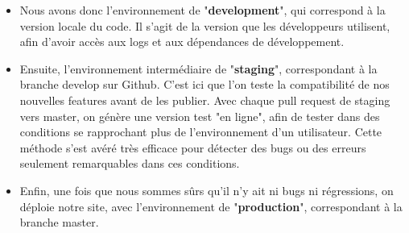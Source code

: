 \begin{itemize}
    \item Nous avons donc l'environnement de "\textbf{development}", qui correspond à la version locale du code. Il s'agit de la version que les développeurs utilisent, afin d'avoir accès aux logs et aux dépendances de développement. 
    \item Ensuite, l'environnement intermédiaire de "\textbf{staging}", correspondant à la branche develop sur Github. C'est ici que l'on teste la compatibilité de nos nouvelles features avant de les publier. Avec chaque pull request de staging vers master, on génère une version test "en ligne", afin de tester dans des conditions se rapprochant plus de l'environnement d'un utilisateur. Cette méthode s'est avéré très efficace pour détecter des bugs ou des erreurs seulement remarquables dans ces conditions. 
    \item Enfin, une fois que nous sommes sûrs qu'il n'y ait ni bugs ni régressions, on déploie notre site, avec l'environnement de "\textbf{production}", correspondant à la branche master.
\end{itemize}

